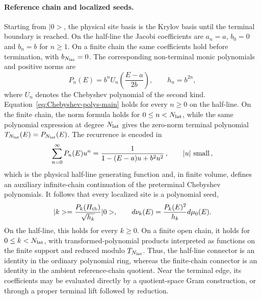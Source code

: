\documentclass[a4paper,11pt]{article}
\def\ket#1{|#1>}%
\def\dd{d}%
\theoremstyle{definition}
\theoremstyle{remark}
\newcommand{\ket}[1]{|#1\rangle}
\newcommand{\dd}{\mathrm d}
\begin{document}
\paragraph{Reference chain and localized seeds.}
Starting from \(\ket0\), the physical site basis is the Krylov basis until the terminal boundary is reached. On the half-line the Jacobi coefficients are \(a_n=a\), \(b_0=0\) and \(b_n=b\) for \(n\ge1\). On a finite chain the same coefficients hold before termination, with \(b_{N_{\rm lat}}=0\). The corresponding non-terminal monic polynomials and positive norms are
\begin{equation}
   P_n(E)=b^n U_n\left(\frac{E-a}{2b}\right),
   \qquad h_n=b^{2n},
   \label{eq:Chebyshev-polys-main}
\end{equation}
where \(U_n\) denotes the Chebyshev polynomial of the second kind. Equation~\eqref{eq:Chebyshev-polys-main} holds for every \(n\ge0\) on the half-line. On the finite chain, the norm formula holds for \(0\le n<N_{\rm lat}\), while the same polynomial expression at degree \(N_{\rm lat}\) gives the zero-norm terminal polynomial
\(
T_{N_{\rm lat}}(E)=P_{N_{\rm lat}}(E)
\).
The recurrence is encoded in
\begin{equation}
   \sum_{n=0}^{\infty}P_n(E)u^n
   =\frac{1}{1-(E-a)u+b^2u^2}\,,
   \qquad |u|\ \hbox{small}\,,
   \label{eq:Chebyshev-gen-main}
\end{equation}
which is the physical half-line generating function and, in finite volume, defines an auxiliary infinite-chain continuation of the preterminal Chebyshev polynomials. It follows that every localized site is a polynomial seed,
\begin{equation}
   \ket{k}=\frac{P_k(H_{\rm tb})}{\sqrt{h_k}}\ket0,
   \qquad
   \dd\nu_k(E)=\frac{P_k(E)^2}{h_k}\dd\mu_0(E).
   \label{eq:tight-binding-shift-main}
\end{equation}
On the half-line, this holds for every \(k\ge0\). On a finite open chain, it holds for \(0\le k<N_{\rm lat}\), with transformed-polynomial products interpreted as functions on the finite support and reduced modulo \(T_{N_{\rm lat}}\). Thus, the half-line connector is an identity in the ordinary polynomial ring, whereas the finite-chain connector is an identity in the ambient reference-chain quotient. Near the terminal edge, its coefficients may be evaluated directly by a quotient-space Gram construction, or through a proper terminal lift followed by reduction.
\end{document}
